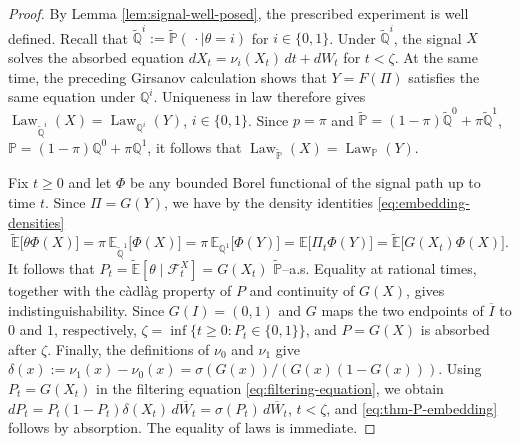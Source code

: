 \documentclass[10pt,a4paper]{amsart}
\begin{document}
\begin{proof}
By Lemma \ref{lem:signal-well-posed}, the prescribed experiment is
well defined. Recall that $\widetilde{\mathbb Q}^i:=\widetilde{\mathbb P}(\,\cdot\mid\theta=i)$ for $i\in\{0,1\}$. Under $\widetilde{\mathbb Q}^i$, the signal $X$ solves the absorbed equation $dX_t=\nu_i(X_t)\,dt+dW_t$ for $t<\zeta$.
At the same time, the preceding Girsanov calculation shows that $Y=F(\Pi)$ satisfies
the same equation under $\mathbb Q^i$. Uniqueness in law therefore gives $\operatorname{Law}_{\widetilde{\mathbb Q}^i}(X)=\operatorname{Law}_{\mathbb Q^i}(Y)$, $i\in\{0,1\}$. Since $p=\pi$ and $\widetilde{\mathbb P}
  =
  (1-\pi)\widetilde{\mathbb Q}^0
  +
  \pi\widetilde{\mathbb Q}^1$, $\mathbb P
  =
  (1-\pi)\mathbb Q^0+\pi\mathbb Q^1$,
it follows that $\operatorname{Law}_{\widetilde{\mathbb P}}(X)=\operatorname{Law}_{\mathbb P}(Y)$.

Fix $t\geq0$ and let $\Phi$ be any bounded Borel functional of the signal path up to time $t$. Since $\Pi=G(Y)$, we have by the density
identities \eqref{eq:embedding-densities}
\[
  \widetilde{\mathbb E}\bigl[\theta\Phi(X)\bigr]
  =
  \pi\,
  \mathbb E_{\widetilde{\mathbb Q}^1}\bigl[\Phi(X)\bigr] =
  \pi\,
  \mathbb E_{\mathbb Q^1}\bigl[\Phi(Y)\bigr] =
  \mathbb E\bigl[\Pi_t\Phi(Y)\bigr] =
  \widetilde{\mathbb E}
  \bigl[G(X_t)\Phi(X)\bigr].
\]
It follows that $P_t= \widetilde{\mathbb E}[\theta\mid\mathcal F_t^X]=G(X_t)$ $\widetilde{\mathbb P}$--a.s.
Equality at rational times, together with the c\`adl\`ag property of
$P$ and continuity of $G(X)$, gives indistinguishability. Since $G(I)=(0,1)$ and $G$ maps the two endpoints of $\overline I$
to $0$ and $1$, respectively, $\zeta
  =
  \inf\{t\geq0:P_t\in\{0,1\}\}$,
and $P=G(X)$ is absorbed after $\zeta$. Finally, the definitions of $\nu_0$ and $\nu_1$ give $\delta(x):=
  \nu_1(x)-\nu_0(x) 
  =
  \sigma(G(x))/(G(x)(1-G(x)))$.
Using $P_t=G(X_t)$ in the filtering equation
\eqref{eq:filtering-equation}, we obtain $dP_t
  =
  P_t(1-P_t)\delta(X_t)\,d\overline W_t=
  \sigma(P_t)\,d\overline W_t$, $t<\zeta$,
and \eqref{eq:thm-P-embedding} follows by absorption. The equality of laws is immediate.
\end{proof}
\end{document}
